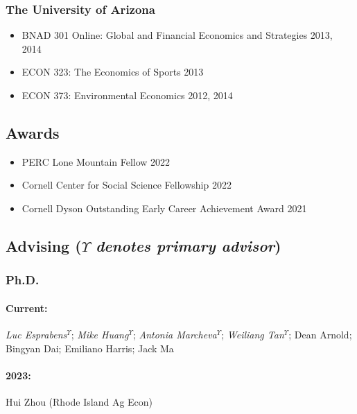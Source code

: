 \documentclass[12pt]{res} %
\begin{document}
\begin{resume}
\subsubsection{The University of Arizona}
\begin{itemize} \itemsep -1pt %
	\item[] BNAD 301 Online: Global and Financial Economics and Strategies \hfill 2013, 2014
	\item[] ECON 323: The Economics of Sports \hfill 2013
	\item[] ECON 373: Environmental Economics \hfill 2012, 2014
\end{itemize}

\vspace{-.2in}

\subsection{Awards}
\begin{itemize} \itemsep -1pt
	\item[] PERC Lone Mountain Fellow \hfill 2022
	\item[] Cornell Center for Social Science Fellowship \hfill 2022
	\item[] Cornell Dyson Outstanding Early Career Achievement Award \hfill 2021
\end{itemize}

\vspace{-.2in}

\subsection{Advising ($\Upsilon$ \textit{denotes primary advisor})  }
\vspace{-.2in}
 
\subsubsection{Ph.D.}\vspace{-.2in}
\paragraph{Current:} \textit{Luc Esprabens}$^\Upsilon$; \textit{Mike Huang}$^\Upsilon$; \textit{Antonia Marcheva}$^\Upsilon$; \textit{Weiliang Tan}$^\Upsilon$; Dean Arnold; Bingyan Dai; Emiliano Harris; Jack Ma
\vspace{-.35in}
\paragraph{2023:} Hui Zhou (Rhode Island Ag Econ)
\vspace{-.35in}

\end{resume}
\end{document}
